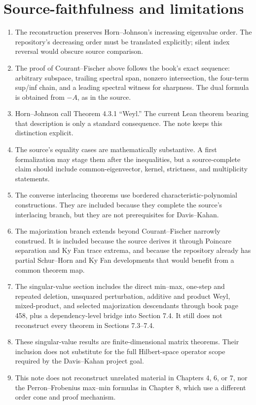 \section{Source-faithfulness and limitations}

\begin{enumerate}[leftmargin=2em]
\item The reconstruction preserves Horn--Johnson's increasing eigenvalue order. The repository's decreasing order must be translated explicitly; silent index reversal would obscure source comparison.
\item The proof of Courant--Fischer above follows the book's exact sequence: arbitrary subspace, trailing spectral span, nonzero intersection, the four-term sup/inf chain, and a leading spectral witness for sharpness. The dual formula is obtained from $-A$, as in the source.
\item Horn--Johnson call Theorem 4.3.1 ``Weyl.'' The current Lean theorem bearing that description is only a standard consequence. The note keeps this distinction explicit.
\item The source's equality cases are mathematically substantive. A first formalization may stage them after the inequalities, but a source-complete claim should include common-eigenvector, kernel, strictness, and multiplicity statements.
\item The converse interlacing theorems use bordered characteristic-polynomial constructions. They are included because they complete the source's interlacing branch, but they are not prerequisites for Davis--Kahan.
\item The majorization branch extends beyond Courant--Fischer narrowly construed. It is included because the source derives it through Poincare separation and Ky Fan trace extrema, and because the repository already has partial Schur--Horn and Ky Fan developments that would benefit from a common theorem map.
\item The singular-value section includes the direct min--max, one-step and repeated deletion, unsquared perturbation, additive and product Weyl, mixed-product, and selected majorization descendants through book page 458, plus a dependency-level bridge into Section 7.4. It still does not reconstruct every theorem in Sections 7.3--7.4.
\item These singular-value results are finite-dimensional matrix theorems. Their inclusion does not substitute for the full Hilbert-space operator scope required by the Davis--Kahan project goal.
\item This note does not reconstruct unrelated material in Chapters 4, 6, or 7, nor the Perron--Frobenius max--min formulas in Chapter 8, which use a different order cone and proof mechanism.
\end{enumerate}

